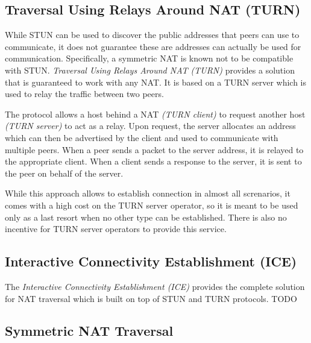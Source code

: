 
\subsection{Traversal Using Relays Around NAT (TURN)}

While STUN can be used to discover the public addresses that peers can use to communicate, it does not guarantee these are addresses can actually be used for communication. Specifically, a symmetric NAT is known not to be compatible with STUN. \textit{Traversal Using Relays Around NAT (TURN)} provides a solution that is guaranteed to work with any NAT. It is based on a TURN server which is used to relay the traffic between two peers.

The protocol allows a host behind a NAT \textit{(TURN client)} to request another host \textit{(TURN server)} to act as a relay. Upon request, the server allocates an address which can then be advertised by the client and used to communicate with multiple peers. When a peer sends a packet to the server address, it is relayed to the appropriate client. When a client sends a response to the server, it is sent to the peer on behalf of the server.

While this approach allows to establish connection in almost all screnarios, it comes with a high cost on the TURN server operator, so it is meant to be used only as a last resort when no other type can be established. There is also no incentive for TURN server operators to provide this service.

\subsection{Interactive Connectivity Establishment (ICE)}

The \textit{Interactive Connectivity Establishment (ICE)} \cite{ice} provides the complete solution for NAT traversal which is built on top of STUN and TURN protocols. TODO


\subsection{Symmetric NAT Traversal}


